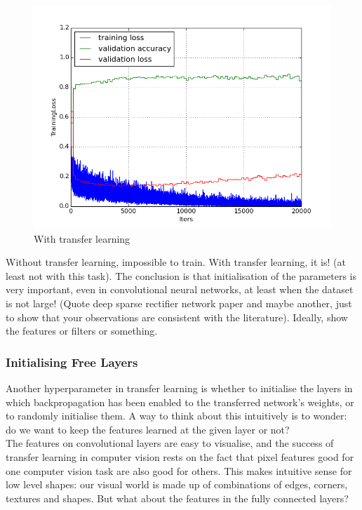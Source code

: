 \documentclass[a4paper,11pt]{article}
\begin{document}
\begin{figure}[h!]
	\centering
	\includegraphics[scale=0.5]{images/plot_clampdet_none.png}
	\caption{With transfer learning}
\end{figure}


Without transfer learning, impossible to train. With transfer learning, it is! (at least not with this task). The conclusion is that initialisation of the parameters is very important, even in convolutional neural networks, at least when the dataset is not large! (Quote deep sparse rectifier network paper and maybe another, just to show that your observations are consistent with the literature). Ideally, show the features or filters or something. \\

\subsubsection{Initialising Free Layers}

Another hyperparameter in transfer learning is whether to initialise the layers in which backpropagation has been enabled to the transferred network's weights, or to randomly initialise them. A way to think about this intuitively is to wonder: do we want to keep the features learned at the given layer or not? \\

The features on convolutional layers are easy to visualise, and the success of transfer learning in computer vision rests on the fact that pixel features good for one computer vision task are also good for others. This makes intuitive sense for low level shapes: our visual world is made up of combinations of edges, corners, textures and shapes. But what about the features in the fully connected layers? \\
\end{document}
